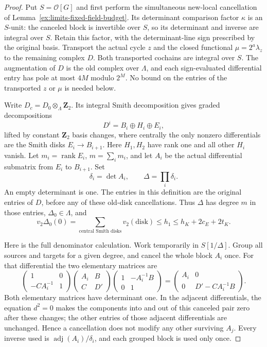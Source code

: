 \documentclass[11pt]{article}
\theoremstyle{definition}
\theoremstyle{remark}
\providecommand{\mathscr}[1]{\mathcal{#1}}
\begin{document}
\begin{proof}\leavevmode
Put $S=\mathscr O[G]$ and first perform the simultaneous new-local
cancellation of Lemma~\ref{ex:limits-fixed-field-budget}.  Its
determinant comparison factor $\kappa$ is an $S$-unit: the canceled
block is invertible over $S$, so its determinant and inverse are
integral over $S$.  Retain this factor, with the determinant-line
sign prescribed by the original basis.  Transport the actual cycle
$z$ and the closed functional $\mu=2^a\lambda_z$ to the remaining
complex $D$.  Both transported cochains are integral over $S$.
The augmentation of $D$ is the old complex over $\Lambda$, and
each sign-evaluated differential entry has pole at most $4M$
modulo $2^M$.  No bound on the entries of the transported $z$ or
$\mu$ is needed below.

Write $D_c=D_0\otimes_\Lambda\mathbf Z_2$.  Its integral Smith
decomposition gives graded decompositions
\[
 D^i=B_i\oplus H_i\oplus E_i,
\]
lifted by constant $\mathbf Z_2$ basis changes, where centrally the
only nonzero differentials are the Smith disks $E_i\to B_{i+1}$.
Here $H_1,H_2$ have rank one and all other $H_i$ vanish.  Let
$m_i=\operatorname{rank}E_i$, $m=\sum_i m_i$, and let $A_i$ be the
actual differential submatrix from $E_i$ to $B_{i+1}$.  Set
\[
 \delta_i=\det A_i,\qquad \Delta=\prod_i\delta_i.
\]
An empty determinant is one.  The entries in this definition are
the original entries of $D$, before any of these old-disk
cancellations.  Thus $\Delta$ has degree $m$ in those entries,
$\Delta_0\in\Lambda$, and
\[
 v_2\Delta_0(0)=\sum_{\text{central Smith disks}}v_2(\text{disk})
       \le h_1\le h_K+2c_E+2t_K.
\]

Here is the full denominator calculation.  Work temporarily in
$S[1/\Delta]$.  Group all sources and targets for a given degree,
and cancel the whole block $A_i$ once.  For that differential the
two elementary matrices are
\[
 \begin{pmatrix}1&0\\-CA_i^{-1}&1\end{pmatrix}
 \begin{pmatrix}A_i&B\\C&D'\end{pmatrix}
 \begin{pmatrix}1&-A_i^{-1}B\\0&1\end{pmatrix}
 =\begin{pmatrix}A_i&0\\0&D'-CA_i^{-1}B\end{pmatrix}.
\]
Both elementary matrices have determinant one.  In the adjacent
differentials, the equation $d^2=0$ makes the components into and
out of this canceled pair zero after these changes; the other
entries of those adjacent differentials are unchanged.  Hence a
cancellation does not modify any other surviving $A_j$.  Every
inverse used is $\operatorname{adj}(A_i)/\delta_i$, and each grouped
block is used only once.


\end{proof}
\end{document}
